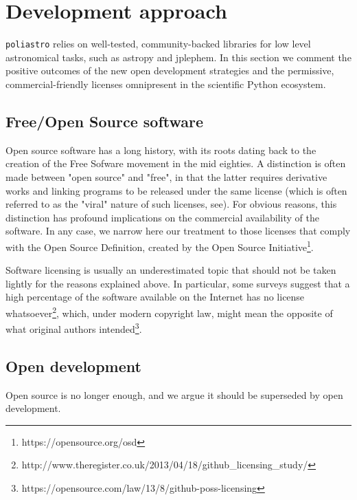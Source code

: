 \section{Development approach}
\label{sec:development}

\verb|poliastro| relies on well-tested, community-backed libraries for low level astronomical tasks, such as astropy\cite{Robitaille2013} and jplephem. In this section we comment the positive outcomes of the new open development strategies and the permissive, commercial-friendly licenses omnipresent in the scientific Python ecosystem.

\subsection{Free/Open Source software}

Open source software has a long history, with its roots dating back to the creation of the Free Sofware movement in the mid eighties\cite{Stallman:1985:GM}. A distinction is often made between "open source" and "free", in that the latter requires derivative works and linking programs to be released under the same license (which is often referred to as the "viral" nature of such licenses, see\cite{stallman2009viewpoint}). For obvious reasons, this distinction has profound implications on the commercial availability of the software. In any case, we narrow here our treatment to those licenses that comply with the Open Source Definition, created by the Open Source Initiative\footnote{https://opensource.org/osd}.

Software licensing is usually an underestimated topic that should not be taken lightly for the reasons explained above. In particular, some surveys suggest that a high percentage of the software available on the Internet has no license whatsoever\footnote{http://www.theregister.co.uk/2013/04/18/github_licensing_study/}, which, under modern copyright law, might mean the opposite of what original authors intended\footnote{https://opensource.com/law/13/8/github-poss-licensing}.


\subsection{Open development}

Open source is no longer enough, and we argue it should be superseded by open development.


